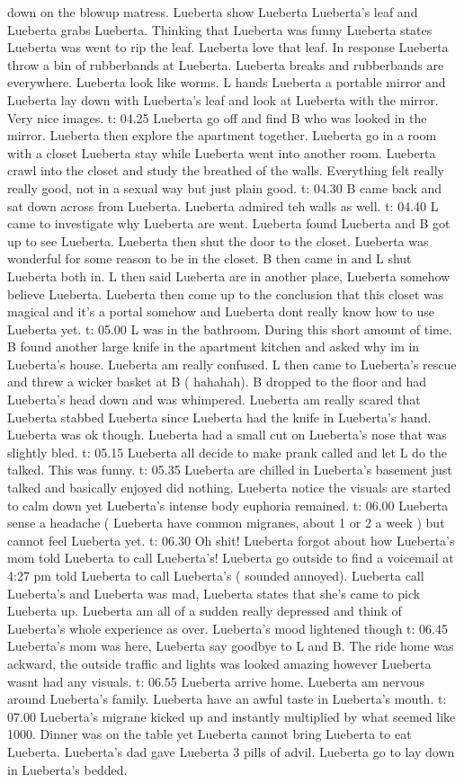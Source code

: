 \documentclass[12pt]{book}
\begin{document}
down on the blowup matress. Lueberta show Lueberta Lueberta's leaf and Lueberta grabs Lueberta. Thinking that Lueberta was funny Lueberta states Lueberta was went to rip the leaf. Lueberta love that leaf. In response Lueberta throw a bin of rubberbands at Lueberta. Lueberta breaks and rubberbands are everywhere. Lueberta look like worms. L hands Lueberta a portable mirror and Lueberta lay down with Lueberta's leaf and look at Lueberta with the mirror. Very nice images. t: 04.25 Lueberta go off and find B who was looked in the mirror. Lueberta then explore the apartment together. Lueberta go in a room with a closet Lueberta stay while Lueberta went into another room. Lueberta crawl into the closet and study the breathed of the walls. Everything felt really really good, not in a sexual way but just plain good. t: 04.30 B came back and sat down across from Lueberta. Lueberta admired teh walls as well. t: 04.40 L came to investigate why Lueberta are went. Lueberta found Lueberta and B got up to see Lueberta. Lueberta then shut the door to the closet. Lueberta was wonderful for some reason to be in the closet. B then came in and L shut Lueberta both in. L then said Lueberta are in another place, Lueberta somehow believe Lueberta. Lueberta then come up to the conclusion that this closet was magical and it's a portal somehow and Lueberta dont really know how to use Lueberta yet. t: 05.00 L was in the bathroom. During this short amount of time. B found another large knife in the apartment kitchen and asked why im in Lueberta's house. Lueberta am really confused. L then came to Lueberta's rescue and threw a wicker basket at B ( hahahah). B dropped to the floor and had Lueberta's head down and was whimpered. Lueberta am really scared that Lueberta stabbed Lueberta since Lueberta had the knife in Lueberta's hand. Lueberta was ok though. Lueberta had a small cut on Lueberta's nose that was slightly bled. t: 05.15 Lueberta all decide to make prank called and let L do the talked. This was funny. t: 05.35 Lueberta are chilled in Lueberta's basement just talked and basically enjoyed did nothing. Lueberta notice the visuals are started to calm down yet Lueberta's intense body euphoria remained. t: 06.00 Lueberta sense a headache ( Lueberta have common migranes, about 1 or 2 a week ) but cannot feel Lueberta yet. t: 06.30 Oh shit! Lueberta forgot about how Lueberta's mom told Lueberta to call Lueberta's! Lueberta go outside to find a voicemail at 4:27 pm told Lueberta to call Lueberta's ( sounded annoyed). Lueberta call Lueberta's and Lueberta was mad, Lueberta states that she's came to pick Lueberta up. Lueberta am all of a sudden really depressed and think of Lueberta's whole experience as over. Lueberta's mood lightened though t: 06.45 Lueberta's mom was here, Lueberta say goodbye to L and B. The ride home was ackward, the outside traffic and lights was looked amazing however Lueberta wasnt had any visuals. t: 06.55 Lueberta arrive home. Lueberta am nervous around Lueberta's family. Lueberta have an awful taste in Lueberta's mouth. t: 07.00 Lueberta's migrane kicked up and instantly multiplied by what seemed like 1000. Dinner was on the table yet Lueberta cannot bring Lueberta to eat Lueberta. Lueberta's dad gave Lueberta 3 pills of advil. Lueberta go to lay down in Lueberta's bedded. 
\end{document}
